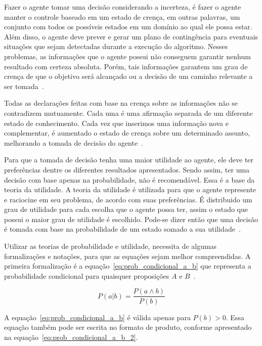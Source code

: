 Fazer o agente tomar uma decisão considerando a incerteza, é fazer o agente manter o controle baseado em um estado de crença, em outras palavras, um conjunto com todos os possíveis estados em um domínio ao qual ele possa estar. Além disso, o agente deve prever e gerar um plano de contingência para eventuais situações que sejam detectadas durante a execução do algoritmo. Nesses problemas, as informações que o agente possui não conseguem garantir nenhum resultado com certeza absoluta. Porém, tais informações garantem um grau de crença de que o objetivo será alcançado ou a decisão de um caminho relevante a ser tomada~\cite{russell:2002, faceli:2011}.

Todas as declarações feitas com base na crença sobre as informações não se contradizem mutuamente. Cada uma é uma afirmação separada de um diferente estado de conhecimento. Cada vez que inserimos uma informação nova e complementar, é aumentado o estado de crença sobre um determinado assunto, melhorando a tomada de decisão do agente~\cite{faceli:2011}.

Para que a tomada de decisão tenha uma maior utilidade ao agente, ele deve ter preferências dentre os diferentes resultados apresentados. Sendo assim, ter uma decisão com base apenas na probabilidade, não é recomendável. Essa é a base da teoria da utilidade. A teoria da utilidade é utilizada para que o agente represente e raciocine em seu problema, de acordo com suas preferências. É distribuido um grau de utilidade para cada escolha que o agente possa ter, assim o estado que possui o maior grau de utilidade é escolhido. Pode-se dizer então que uma decisão é tomada com base na probabilidade de um estado somado a sua utilidade~\cite{russell:2002}.

Utilizar as teorias de probabilidade e utilidade, necessita de algumas formalizações e notações, para que as equações sejam melhor compreendidas. A primeira formalização é a equação~\ref{eq:prob_condicional_a_b} que representa a probabilidade condicional para quaisquer proposições $A$ e $B$~\cite{russell:2002}.

\begin{equation}
    \label{eq:prob_condicional_a_b}
    P(a|b) = \frac{P(a \land b)}{P(b)}
\end{equation}

A equação~\ref{eq:prob_condicional_a_b} é válida apenas para $P(b) > 0$. Essa equação também pode ser escrita no formato de produto, conforme apresentado na equação~\ref{eq:prob_condicional_a_b_2}.

